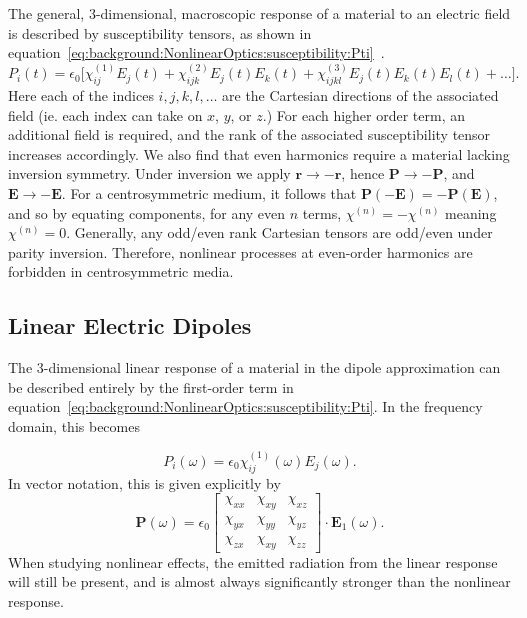 The general, 3-dimensional, macroscopic response of a material to an electric field is described by susceptibility tensors, as shown in equation~\ref{eq:background:NonlinearOptics:susceptibility:Pti}~\cite[\S 1.1]{Boyd2008a}.
\begin{equation}\label{eq:background:NonlinearOptics:susceptibility:Pti}
	P_{i}(t) =  \epsilon_{0}\big[
				\chi^{(1)}_{ij}  E_{j}(t) +
				\chi^{(2)}_{ijk}  E_{j}(t) E_{k}(t) +
				\chi^{(3)}_{ijkl}  E_{j}(t) E_{k}(t) E_{l}(t)+ \ldots
				\big].
\end{equation}
Here each of the indices $i,j,k,l,\ldots$ are the Cartesian directions of the associated field (ie. each index can take on $x$, $y$, or $z$.) For each higher order term, an additional field is required, and the rank of the associated susceptibility tensor increases accordingly. 
We also find that even harmonics require a material lacking inversion symmetry. Under inversion we apply $\mathbf{r}\rightarrow -\mathbf{r}$, hence $\mathbf{P} \rightarrow -\mathbf{P}$, and $\mathbf{E} \rightarrow -\mathbf{E}$. For a centrosymmetric medium, it follows that $\mathbf{P}(-\mathbf{E}) = -\mathbf{P}(\mathbf{E})$, and so by equating components, for any even $n$ terms, $\chi^{(n)}=-\chi^{(n)}$ meaning $\chi^{(n)} = 0$. Generally, any odd/even rank Cartesian tensors are odd/even under parity inversion. Therefore, nonlinear processes at even-order harmonics are forbidden in centrosymmetric media.

\subsection{Linear Electric Dipoles}\label{sec:background:NonlinearOptics:linearP}
The 3-dimensional linear response of a material in the dipole approximation can be described entirely by the first-order term in equation~\ref{eq:background:NonlinearOptics:susceptibility:Pti}. In the frequency domain, this becomes

\begin{equation}
	P_{i}(\omega) =  \epsilon_{0}
				\chi^{(1)}_{ij}(\omega)  E_{j}(\omega).
\end{equation}
In vector notation, this is given explicitly by
\begin{equation}
	\mathbf{P}(\omega) =  \epsilon_{0}
				\begin{bmatrix}
		\chi_{xx} & \chi_{xy} & \chi_{xz}\\ 
		\chi_{yx} & \chi_{yy} & \chi_{yz}\\ 
		\chi_{zx} & \chi_{xy} & \chi_{zz}
	\end{bmatrix} \cdot \mathbf{E}_{1}(\omega).
\end{equation}
When studying nonlinear effects, the emitted radiation from the linear response will still be present, and is almost always significantly stronger than the nonlinear response.


